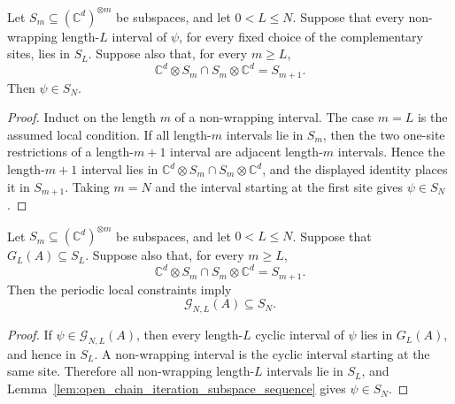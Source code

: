 \begin{lemma}%
    \label{lem:open_chain_iteration_subspace_sequence}
    \leanok
    Let \(S_m\subseteq(\mathbb C^d)^{\otimes m}\) be subspaces, and let
    \(0<L\le N\). Suppose that every non-wrapping length-\(L\) interval of
    \(\psi\), for every fixed choice of the complementary sites, lies in \(S_L\).
    Suppose also that, for every \(m\ge L\),
    \[
        \mathbb C^d\otimes S_m\cap S_m\otimes\mathbb C^d=S_{m+1}.
    \]
    Then \(\psi\in S_N\).
\end{lemma}

\begin{proof}
    \leanok
    Induct on the length \(m\) of a non-wrapping interval.  The case \(m=L\)
    is the assumed local condition.  If all length-\(m\) intervals lie in
    \(S_m\), then the two one-site restrictions of a length-\(m+1\) interval are
    adjacent length-\(m\) intervals.  Hence the length-\(m+1\) interval lies in
    \(\mathbb C^d\otimes S_m\cap S_m\otimes\mathbb C^d\), and the displayed
    identity places it in \(S_{m+1}\).  Taking \(m=N\) and the interval starting
    at the first site gives \(\psi\in S_N\).
\end{proof}

\begin{lemma}%
    \label{lem:periodic_constraints_propagated_subspace_sequence}
    \leanok
    Let \(S_m\subseteq(\mathbb C^d)^{\otimes m}\) be subspaces, and let
    \(0<L\le N\).  Suppose that \(G_L(A)\subseteq S_L\).  Suppose also that, for
    every \(m\ge L\),
    \[
        \mathbb C^d\otimes S_m\cap S_m\otimes\mathbb C^d=S_{m+1}.
    \]
    Then the periodic local constraints imply
    \[
        \mathcal G_{N,L}(A)\subseteq S_N.
    \]
\end{lemma}

\begin{proof}
    \leanok
    If \(\psi\in\mathcal G_{N,L}(A)\), then every length-\(L\) cyclic interval of
    \(\psi\) lies in \(G_L(A)\), and hence in \(S_L\).  A non-wrapping interval
    is the cyclic interval starting at the same site.  Therefore all
    non-wrapping length-\(L\) intervals lie in \(S_L\), and
    Lemma~\ref{lem:open_chain_iteration_subspace_sequence} gives
    \(\psi\in S_N\).
\end{proof}

